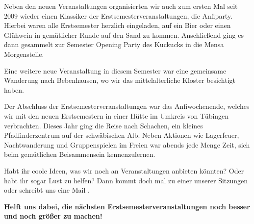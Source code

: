Neben den neuen Veranstaltungen organisierten wir auch zum ersten Mal seit 2009 wieder einen Klassiker der Erstsemesterveranstaltungen, die Anfiparty. Hierbei waren alle Erstsemester herzlich eingeladen, auf ein Bier oder einen Glühwein in gemütlicher Runde auf den Sand zu kommen. Anschließend ging es dann gesammelt zur Semester Opening Party des Kuckucks in die Mensa Morgenstelle.

Eine weitere neue Veranstaltung in diesem Semester war eine gemeinsame Wanderung nach Bebenhausen, wo wir das mittelalterliche Kloster besichtigt haben.

Der Abschluss der Erstsemesterveranstaltungen war das Anfiwochenende, welches wir mit den neuen Erstsemestern in einer Hütte im Umkreis von Tübingen verbrachten.
Dieses Jahr ging die Reise nach Schachen, ein kleines Pfadfinderzentrum auf der schwäbischen Alb. Neben Aktionen wie Lagerfeuer, Nachtwanderung und Gruppenspielen im Freien war abends jede Menge Zeit, sich beim gemütlichen Beisammensein kennenzulernen. 

Habt ihr coole Ideen, was wir noch an Veranstaltungen anbieten könnten? Oder habt ihr sogar Lust zu helfen? Dann kommt doch mal zu einer unserer Sitzungen
oder schreibt uns eine Mail
.

\textbf{Helft uns dabei, die nächsten Erstsemesterveranstaltungen noch besser und noch größer zu machen!}

